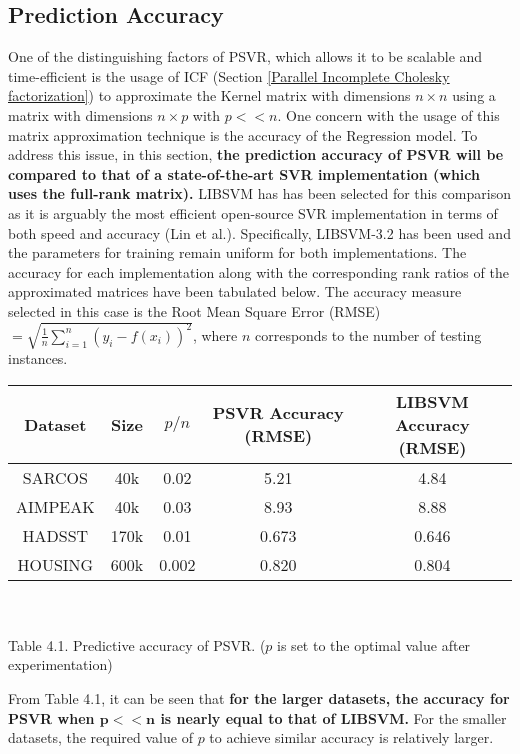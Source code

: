 \documentclass[12pt]{article}
\begin{document}
\subsection{Prediction Accuracy}
\label{Prediction Accuracy}
One of the distinguishing factors of PSVR, which allows it to be scalable and time-efficient is the usage of ICF (Section \ref{Parallel Incomplete Cholesky factorization}) to approximate the Kernel matrix with dimensions $n \times n$ using a matrix with dimensions $n \times p$ with $p << n$. One concern with the usage of this matrix approximation technique is the accuracy of the Regression model. To address this issue, in this section, {\bf the prediction accuracy of PSVR will be compared to that of a state-of-the-art SVR implementation (which uses the full-rank matrix). }
\newline\newline
LIBSVM has has been selected for this comparison as it is arguably the most efficient open-source SVR implementation in terms of both speed and accuracy (Lin et al.). Specifically, LIBSVM-3.2 has been used and the parameters for training remain uniform for both implementations.
\newline
The accuracy for each implementation along with the corresponding rank ratios of the approximated matrices have been tabulated below. 
The accuracy measure selected in this case is the Root Mean Square Error (RMSE) $= \sqrt{\frac{1}{n} \sum_{i=1}^{n}{(y_{i} - f(x_{i}))^2}}$, where $n$ corresponds to the number of testing instances.
\begin{center}
\begin{tabular}{ |c|c|c|c|c| }
  \hline
  Dataset & Size & $p/n$ & PSVR Accuracy (RMSE) & LIBSVM Accuracy (RMSE) \\
  \hline
  SARCOS & 40k& 0.02& 5.21 & 4.84 \\
  AIMPEAK & 40k & 0.03 & 8.93 & 8.88 \\
  HADSST & 170k & 0.01 & 0.673 &0.646 \\
  HOUSING & 600k & 0.002 & 0.820 & 0.804 \\
  \hline
\end{tabular}
\ \\
\ \\
Table 4.1. Predictive accuracy of PSVR. ($p$ is set to the optimal value  after experimentation)
\end{center}
From Table 4.1, it can be seen that {\bf for the larger datasets, the accuracy for PSVR when $\bm{p << n}$ is nearly equal to that of LIBSVM.} For the smaller datasets, the required value of $p$ to achieve similar accuracy is relatively larger.
\end{document}
